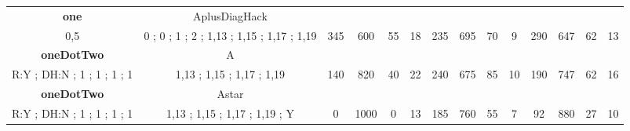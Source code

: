 \begin{table}[H]
{\begin{tabular}{|c|c|c|c|c|c|c|c|c|c|c|c|c|c|}
\cellcolor{blue!15}\textbf{one} & AplusDiagHack& {\color[HTML]{00009B} } & {\color[HTML]{9A0000} } & {\color[HTML]{009901} } &  & {\color[HTML]{00009B} } & {\color[HTML]{9A0000} } & {\color[HTML]{009901} } &  & {\color[HTML]{00009B} } & {\color[HTML]{9A0000} } & {\color[HTML]{009901} } &  \\ 
\cellcolor{ blue!15}0,5 & 0 ; 0 ; 1 ; 2 ; 1,13 ; 1,15 ; 1,17 ; 1,19 & \multirow{-2}{*}{{\color[HTML]{00009B} 345}} & \multirow{-2}{*}{{\color[HTML]{9A0000} 600}} & \multirow{-2}{*}{{\color[HTML]{009901} 55}} & \multirow{-2}{*}{18} & \multirow{-2}{*}{{\color[HTML]{00009B} 235}} & \multirow{-2}{*}{{\color[HTML]{9A0000} 695}} & \multirow{-2}{*}{{\color[HTML]{009901} 70}} & \multirow{-2}{*}{9} & \multirow{-2}{*}{{\color[HTML]{00009B} 290}} & \multirow{-2}{*}{{\color[HTML]{9A0000} 647}} & \multirow{-2}{*}{{\color[HTML]{009901} 62}} & \multirow{-2}{*}{13} \\ \hline

\cellcolor{blue!15}\textbf{oneDotTwo} & A& {\color[HTML]{00009B} } & {\color[HTML]{9A0000} } & {\color[HTML]{009901} } &  & {\color[HTML]{00009B} } & {\color[HTML]{9A0000} } & {\color[HTML]{009901} } &  & {\color[HTML]{00009B} } & {\color[HTML]{9A0000} } & {\color[HTML]{009901} } &  \\ 
\cellcolor{ blue!15}R:Y ; DH:N ; 1 ; 1 ; 1 ; 1 & 1,13 ; 1,15 ; 1,17 ; 1,19 & \multirow{-2}{*}{{\color[HTML]{00009B} 140}} & \multirow{-2}{*}{{\color[HTML]{9A0000} 820}} & \multirow{-2}{*}{{\color[HTML]{009901} 40}} & \multirow{-2}{*}{22} & \multirow{-2}{*}{{\color[HTML]{00009B} 240}} & \multirow{-2}{*}{{\color[HTML]{9A0000} 675}} & \multirow{-2}{*}{{\color[HTML]{009901} 85}} & \multirow{-2}{*}{10} & \multirow{-2}{*}{{\color[HTML]{00009B} 190}} & \multirow{-2}{*}{{\color[HTML]{9A0000} 747}} & \multirow{-2}{*}{{\color[HTML]{009901} 62}} & \multirow{-2}{*}{16} \\ \hline

\cellcolor{blue!15}\textbf{oneDotTwo} & Astar& {\color[HTML]{00009B} } & {\color[HTML]{9A0000} } & {\color[HTML]{009901} } &  & {\color[HTML]{00009B} } & {\color[HTML]{9A0000} } & {\color[HTML]{009901} } &  & {\color[HTML]{00009B} } & {\color[HTML]{9A0000} } & {\color[HTML]{009901} } &  \\ 
\cellcolor{ blue!15}R:Y ; DH:N ; 1 ; 1 ; 1 ; 1 & 1,13 ; 1,15 ; 1,17 ; 1,19 ; Y & \multirow{-2}{*}{{\color[HTML]{00009B} 0}} & \multirow{-2}{*}{{\color[HTML]{9A0000} 1000}} & \multirow{-2}{*}{{\color[HTML]{009901} 0}} & \multirow{-2}{*}{13} & \multirow{-2}{*}{{\color[HTML]{00009B} 185}} & \multirow{-2}{*}{{\color[HTML]{9A0000} 760}} & \multirow{-2}{*}{{\color[HTML]{009901} 55}} & \multirow{-2}{*}{7} & \multirow{-2}{*}{{\color[HTML]{00009B} 92}} & \multirow{-2}{*}{{\color[HTML]{9A0000} 880}} & \multirow{-2}{*}{{\color[HTML]{009901} 27}} & \multirow{-2}{*}{10} \\ \hline


\end{tabular}}
\end{table}
